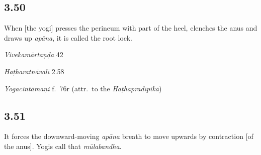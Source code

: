\begin{ekdosis}
\subsection*{3.50}
\begin{translation}[hp03_050]
When [the yogi] presses the perineum with part of the heel, clenches the anus and draws up \emph{apāna}, it is called the root lock.
\end{translation}

\begin{sources}[hp03_050]
\emph{Vivekamārtaṇḍa} 42
\begin{versinnote}
\end{versinnote}
\end{sources}

\begin{testimonia}[hp03_050]
\emph{Haṭharatnāvalī} 2.58
\begin{versinnote}
\end{versinnote}

\emph{Yogacintāmaṇi} f.~76r (attr.~to the \emph{Haṭhapradīpikā})
\begin{versinnote}
\end{versinnote}

\end{testimonia}


\subsection*{3.51}
\begin{translation}[hp03_051]
It forces the downward-moving \emph{apāna} breath to move upwards by contraction [of the anus]. Yogis call that \emph{mūlabandha}.
\end{translation}


\end{ekdosis}
